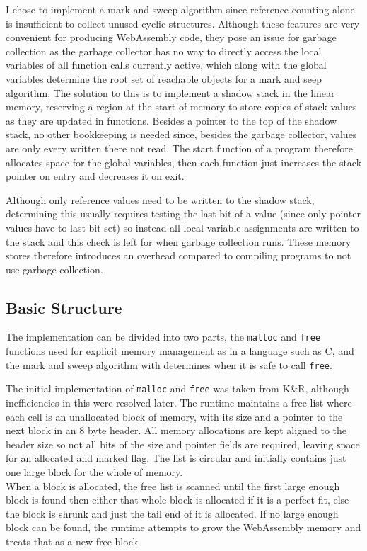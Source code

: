 I chose to implement a mark and sweep algorithm since reference counting alone is insufficient to collect unused cyclic structures. Although these features are very convenient for producing WebAssembly code, they pose an issue for garbage collection as the garbage collector has no way to directly access the local variables of all function calls currently active, which along with the global variables determine the root set of reachable objects for a mark and seep algorithm. The solution to this is to implement a shadow stack in the linear memory, reserving a region at the start of memory to store copies of stack values as they are updated in functions. Besides a pointer to the top of the shadow stack, no other bookkeeping is needed since, besides the garbage collector, values are only every written there not read. The start function of a program therefore allocates space for the global variables, then each function just increases the stack pointer on entry and decreases it on exit. 

Although only reference values need to be written to the shadow stack, determining this usually requires testing the last bit of a value (since only pointer values have to last bit set) so instead all local variable assignments are written to the stack and this check is left for when garbage collection runs. These memory stores therefore introduces an overhead compared to compiling programs to not use garbage collection. %


\subsection{Basic Structure}
The implementation can be divided into two parts, the \verb|malloc| and \verb|free| functions used for explicit memory management as in a language such as C, and the mark and sweep algorithm with determines when it is safe to call \verb|free|.

The initial implementation of \verb|malloc| and \verb|free| was taken from K\&R, although inefficiencies in this were resolved later. %
The runtime maintains a free list where each cell is an unallocated block of memory, with its size and a pointer to the next block in an 8 byte header. All memory allocations are kept aligned to the header size so not all bits of the size and pointer fields are required, leaving space for an allocated and marked flag. The list is circular and initially contains just one large block for the whole of memory. \\
When a block is allocated, the free list is scanned until the first large enough block is found then either that whole block is allocated if it is a perfect fit, else the block is shrunk and just the tail end of it is allocated. If no large enough block can be found, the runtime attempts to grow the WebAssembly memory and treats that as a new free block.

